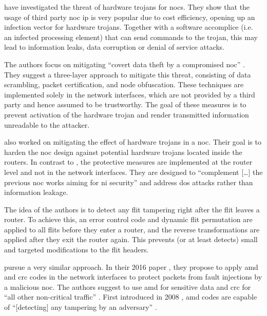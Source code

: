 \citeauthor{ancajas14fortnocs} \cite{ancajas14fortnocs} have investigated the threat of hardware trojans for \glspl{noc}. They show that the usage of
third party \gls{noc} \gls{ip} is very popular due to cost efficiency, opening up an infection vector for hardware
trojans. Together with a software accomplice (i.e. an infected processing element) that can send commands to the trojan, this may
lead to information leaks, data corruption or denial of service attacks.

The authors focus on mitigating \enquote{covert data theft by a compromised \gls{noc}} \cite[3]{ancajas14fortnocs}. They suggest a three-layer
approach to mitigate this threat, consisting of data scrambling, packet certification, and node obfuscation. These techniques are
implemented solely in the network interfaces, which are not provided by a third party and hence assumed to be trustworthy. The goal of these measures
is to prevent activation of the hardware trojan and render transmitted information unreadable to the attacker.

\citeauthor{frey17hardenednoc} \cite{frey17hardenednoc} also worked on mitigating the effect of hardware trojans in a \gls{noc}. Their goal is to
harden the \gls{noc} design against potential hardware trojans located inside the routers. In contrast to \citeauthor{ancajas14fortnocs}
\cite{ancajas14fortnocs}, the protective measures are implemented at the router level and not in the network interfaces. They are designed to
\enquote{complement […] the previous \gls{noc} works aiming for \gls{ni} security} \cite[16]{frey17hardenednoc} and address \gls{dos} attacks rather
than information leakage.

The idea of the authors is to detect any flit tampering right after the flit leaves a router. To achieve this, an error control code and dynamic flit
permutation are applied to all flits before they enter a router, and the reverse transformations are applied after they exit the router again. This
prevents (or at least detects) small and targeted modifications to the flit headers. %

\citeauthor{boraten16packetsecurity} pursue a very similar approach. In their 2016 paper \cite{boraten16packetsecurity}, they propose to apply
\gls{amd} and \gls{crc} codes in the network interfaces to protect packets from fault injections by a malicious \gls{noc}. The authors suggest to use
\gls{amd} for sensitive data and \gls{crc} for \enquote{all other non-critical traffic} \cite[2]{boraten16packetsecurity}. First introduced in 2008
\cite{cramer08amdcodes}, \gls{amd} codes are capable of \enquote{[detecting] any tampering by an adversary} \cite[1]{cramer08amdcodes}.

